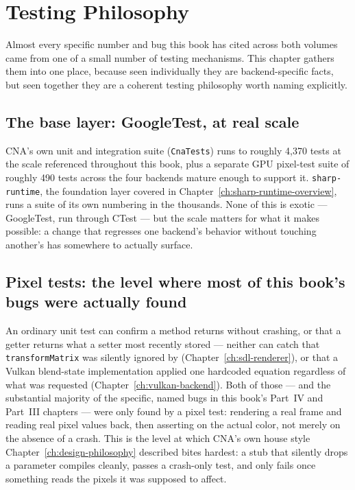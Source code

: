 \chapter{Testing Philosophy}
\label{ch:testing-philosophy}

Almost every specific number and bug this book has cited across both volumes came from one
of a small number of testing mechanisms. This chapter gathers them into one place, because
seen individually they are backend-specific facts, but seen together they are a coherent
testing philosophy worth naming explicitly.

\section{The base layer: GoogleTest, at real scale}

CNA's own unit and integration suite (\texttt{CnaTests}) runs to roughly 4{,}370 tests at the
scale referenced throughout this book, plus a separate GPU pixel-test suite of roughly 490
tests across the four backends mature enough to support it. \texttt{sharp-runtime}, the
foundation layer covered in Chapter~\ref{ch:sharp-runtime-overview}, runs a suite of its own
numbering in the thousands. None of this is exotic --- GoogleTest, run through CTest --- but
the scale matters for what it makes possible: a change that regresses one backend's behavior
without touching another's has somewhere to actually surface.

\section{Pixel tests: the level where most of this book's bugs were actually found}

An ordinary unit test can confirm a method returns without crashing, or that a getter returns
what a setter most recently stored --- neither can catch that
\texttt{transformMatrix} was silently ignored by 
(Chapter~\ref{ch:sdl-renderer}), or that a Vulkan blend-state implementation applied one
hardcoded equation regardless of what was requested (Chapter~\ref{ch:vulkan-backend}). Both
of those --- and the substantial majority of the specific, named bugs in this book's Part~IV
and Part~III chapters --- were only found by a pixel test: rendering a real frame and reading
real pixel values back, then asserting on the actual color, not merely on the absence of a
crash. This is the level at which CNA's own house style Chapter~\ref{ch:design-philosophy}
described bites hardest: a stub that silently drops a parameter compiles cleanly, passes a
crash-only test, and only fails once something reads the pixels it was supposed to affect.

